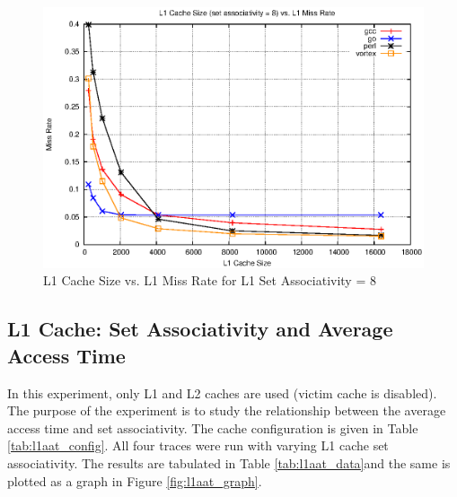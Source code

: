 \documentclass[a4paper]{article}
\begin{document}
\begin{figure}
    \centering
    \includegraphics[scale=1.32] {l1_sa_8.eps}
    \captionsetup{justification=centering}
    \caption{L1 Cache Size vs. L1 Miss Rate for L1 Set Associativity = 8}
    \label{fig:l1mr_graph_sa8}
\end{figure}

\subsection{L1 Cache: Set Associativity and Average Access Time}
In this experiment, only L1 and L2 caches are used (victim cache is disabled). The purpose of the experiment is to study the relationship between the average access time and set associativity. The cache configuration is given in Table \ref{tab:l1aat_config}. All four traces were run with varying L1 cache set associativity. The results are tabulated in Table \ref{tab:l1aat_data}and the same is plotted as a graph in Figure \ref{fig:l1aat_graph}.
\end{document}
